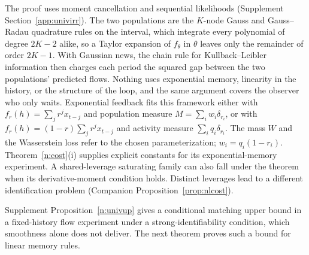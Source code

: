 \documentclass[12pt]{article}
\theoremstyle{definition}
\theoremstyle{remark}
\begin{document}
The proof uses moment cancellation and sequential likelihoods (Supplement Section~\ref{app:univirr}). The two populations are the $K$-node Gauss and Gauss--Radau quadrature rules on the interval, which integrate every polynomial of degree $2K-2$ alike, so a Taylor expansion of $f_\theta$ in $\theta$ leaves only the remainder of order $2K-1$. With Gaussian news, the chain rule for Kullback--Leibler information then charges each period the squared gap between the two populations' predicted flows. Nothing uses exponential memory, linearity in the history, or the structure of the loop, and the same argument covers the observer who only waits. Exponential feedback fits this framework either with $f_r(h)=\sum_jr^jx_{t-j}$ and population measure $M=\sum_iw_i\delta_{r_i}$, or with $f_r(h)=(1-r)\sum_jr^jx_{t-j}$ and activity measure $\sum_iq_i\delta_{r_i}$. The mass $W$ and the Wasserstein loss refer to the chosen parameterization; $w_i=q_i(1-r_i)$. Theorem~\ref{n:cost}(i) supplies explicit constants for its exponential-memory experiment. A shared-leverage saturating family can also fall under the theorem when its derivative-moment condition holds. Distinct leverages lead to a different identification problem (Companion Proposition~\ref{prop:nlcost}).

Supplement Proposition~\ref{n:univup} gives a conditional matching upper bound in a fixed-history flow experiment under a strong-identifiability condition, which smoothness alone does not deliver. The next theorem proves such a bound for linear memory rules.
\end{document}
